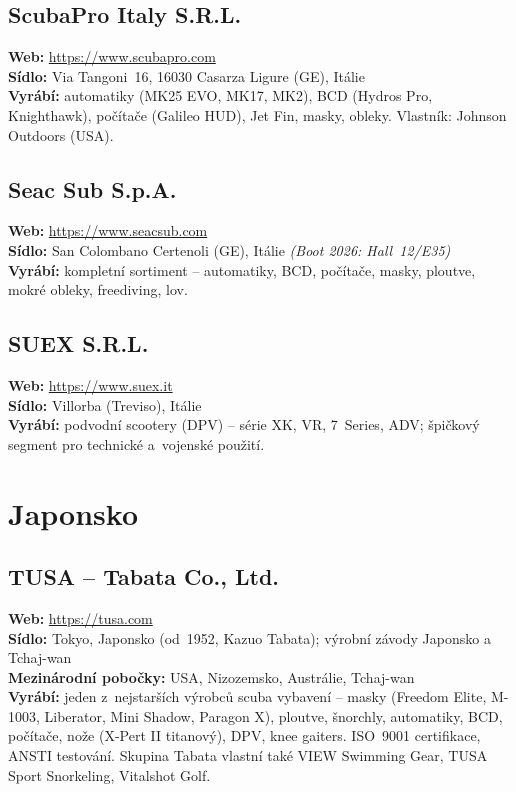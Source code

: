 \documentclass[11pt,a4paper]{article}
\begin{document}
\subsection{ScubaPro Italy S.R.L.}
\textbf{Web:} \url{https://www.scubapro.com} \\
\textbf{Sídlo:} Via Tangoni~16, 16030 Casarza Ligure (GE), Itálie \\
\textbf{Vyrábí:} automatiky (MK25 EVO, MK17, MK2), BCD (Hydros Pro, Knighthawk), počítače (Galileo HUD), Jet Fin, masky, obleky. Vlastník: Johnson Outdoors (USA).

\subsection{Seac Sub S.p.A.}
\textbf{Web:} \url{https://www.seacsub.com} \\
\textbf{Sídlo:} San Colombano Certenoli (GE), Itálie \quad\emph{(Boot 2026: Hall~12/E35)} \\
\textbf{Vyrábí:} kompletní sortiment -- automatiky, BCD, počítače, masky, ploutve, mokré obleky, freediving, lov.

\subsection{SUEX S.R.L.}
\textbf{Web:} \url{https://www.suex.it} \\
\textbf{Sídlo:} Villorba (Treviso), Itálie \\
\textbf{Vyrábí:} podvodní scootery (DPV) -- série XK, VR, 7~Series, ADV; špičkový segment pro technické a~vojenské použití.

\section{Japonsko}

\subsection{TUSA -- Tabata Co., Ltd.}
\textbf{Web:} \url{https://tusa.com} \\
\textbf{Sídlo:} Tokyo, Japonsko (od~1952, Kazuo Tabata); výrobní závody Japonsko a Tchaj-wan \\
\textbf{Mezinárodní pobočky:} USA, Nizozemsko, Austrálie, Tchaj-wan \\
\textbf{Vyrábí:} jeden z~nejstarších výrobců scuba vybavení -- masky (Freedom Elite, M-1003, Liberator, Mini Shadow, Paragon X), ploutve, šnorchly, automatiky, BCD, počítače, nože (X-Pert II titanový), DPV, knee gaiters. ISO~9001 certifikace, ANSTI testování. Skupina Tabata vlastní také VIEW Swimming Gear, TUSA Sport Snorkeling, Vitalshot Golf.
\end{document}
